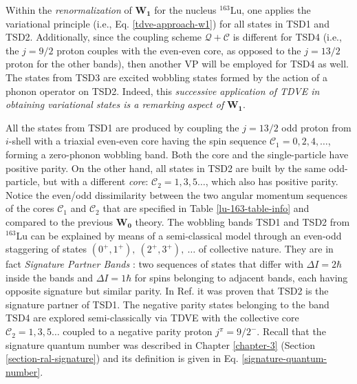 Within the \emph{renormalization} of $\mathbf{W_1}$ for the nucleus $^{163}$Lu, one applies the variational principle (i.e., Eq. \ref{tdve-approach-w1}) for all states in TSD1 and TSD2. Additionally, since the coupling scheme $\mathcal{Q}+\mathscr{C}$ is different for TSD4 (i.e., the $j=9/2$ proton couples with the even-even core, as opposed to the $j=13/2$ proton for the other bands), then another VP will be employed for TSD4 as well. The states from TSD3 are excited wobbling states formed by the action of a phonon operator on TSD2. Indeed, this \emph{successive application of TDVE in obtaining variational states is a remarking aspect of} $\mathbf{W_1}$.

All the states from TSD1 are produced by coupling the $j=13/2$ odd proton from $i$-shell with a triaxial even-even core having the spin sequence $\mathscr{C}_1=0,2,4,\dots$, forming a zero-phonon wobbling band. Both the core and the single-particle have positive parity. On the other hand, all states in TSD2 are built by the same odd-particle, but with a different \emph{core}: $\mathscr{C}_2=1,3,5\dots$, which also has positive parity. Notice the even/odd dissimilarity between the two angular momentum sequences of the cores $\mathscr{C}_1$ and $\mathscr{C}_2$ that are specified in Table \ref{lu-163-table-info} and compared to the previous $\mathbf{W_0}$ theory. The wobbling bands TSD1 and TSD2 from $^{163}$Lu can be explained by means of a semi-classical model through an even-odd staggering of states $(0^+,1^+),\ (2^+,3^+),\ \dots$ of collective nature. They are in fact \emph{Signature Partner Bands} \cite{raduta2020approach}: two sequences of states that differ with $\Delta I=2\hbar$ inside the bands and $\Delta I=1\hbar$ for spins belonging to adjacent bands, each having opposite signature but similar parity. In Ref. \cite{raduta2020towards} it was proven that TSD2 is the signature partner of TSD1. The negative parity states belonging to the band TSD4 are explored semi-classically via TDVE with the collective core $\mathscr{C}_2=1,3,5\dots$ coupled to a negative parity proton $j^\pi=9/2^-$. Recall that the signature quantum number was described in Chapter \ref{chapter-3} (Section \ref{section-ral-signature}) and its definition is given in Eq. \ref{signature-quantum-number}.

